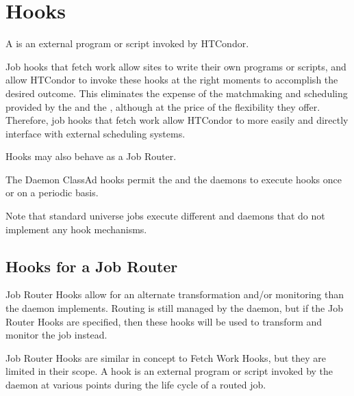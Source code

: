 \section{\label{sec:hooks}Hooks}
A  is an external program or script invoked by HTCondor.

Job hooks that fetch work allow sites to write their own programs or scripts, 
and allow HTCondor to invoke these hooks at the right moments 
to accomplish the desired outcome.
This eliminates the expense of the matchmaking and scheduling provided 
by the  and the ,
although at the price of the flexibility they offer. 
Therefore, job hooks that fetch work allow HTCondor to more easily and directly
interface with external scheduling systems. 

Hooks may also behave as a Job Router.

The Daemon ClassAd hooks permit the  and 
the  daemons to execute hooks once or on a periodic basis.

Note that standard universe jobs execute different  and
 daemons that do not implement any hook mechanisms.




\subsection{\label{sec:job-hooks-JR-overview}
Hooks for a Job Router}

Job Router Hooks allow for an alternate transformation and/or 
monitoring than the  daemon implements.
Routing is still managed by the  daemon,
but if the Job Router Hooks are specified,
then these hooks will be used to transform
and monitor the job instead.

Job Router Hooks are similar in concept to Fetch Work Hooks,
but they are limited in their scope.
A hook is an external program or script invoked by the 
daemon at various points during the life cycle of a routed job.

